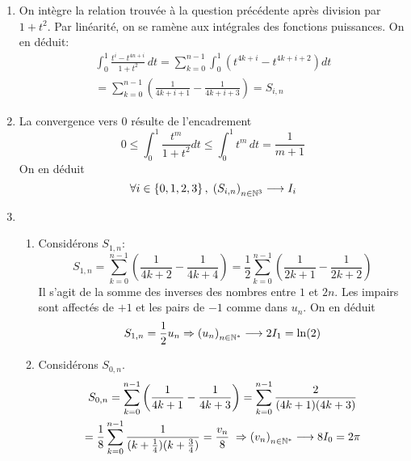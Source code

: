 \begin{enumerate}
  \item On intègre la relation trouvée à la question précédente après division par $1+t^2$. Par linéarité, on se ramène aux intégrales des fonctions puissances. On en déduit:
\begin{multline*}
\int_0^{1}\frac{t^{i} - t^{4n + i}}{1+t^2}\,dt 
= \sum_{k=0}^{n-1}\int_0^1\left( t^{4k+i} - t^{4k+i+2}\right)dt \\
= \sum_{k=0}^{n-1}\left(\frac{1}{4k+i+1} - \frac{1}{4k+i+3}\right)
= S_{i,n}
\end{multline*}

  
  \item La convergence vers $0$ résulte de l'encadrement
\begin{displaymath}
  0 \leq \int_0^1 \frac{t^m}{1+t^2}dt \leq \int_0^1 t^m\,dt = \frac{1}{m+1}
\end{displaymath}
On en déduit
\begin{displaymath}
\forall i\in \left\lbrace  0,1,2,3 \right\rbrace,\; \left( S_{i,n}\right)_{n\in \mathbb{N}^3} \longrightarrow I_i  
\end{displaymath}

  
  \item
\begin{enumerate}
  \item Considérons $S_{1,n}$:
\begin{displaymath}
S_{1,n} = \sum_{k=0}^{n-1}\left( \frac{1}{4k+2} - \frac{1}{4k+4}\right)  
= \frac{1}{2} \sum_{k=0}^{n-1}\left( \frac{1}{2k+1} - \frac{1}{2k+2}\right)
\end{displaymath}
Il s'agit de la somme des inverses des nombres entre $1$ et $2n$. Les impairs sont affectés de $+1$ et les pairs de $-1$ comme dans $u_n$. On en déduit
\begin{displaymath}
  S_{1,n} = \frac{1}{2}u_n \Rightarrow \left( u_n\right)_{n\in \mathbb{N}^*}\longrightarrow 2I_1 = \ln(2)
\end{displaymath}

  \item Considérons $S_{0,n}$.
\begin{multline*}
S_{0,n} = \sum_{k=0}^{n-1}\left( \frac{1}{4k+1} - \frac{1}{4k+3}\right) 
= \sum_{k=0}^{n-1} \frac{2}{(4k+1)(4k+3)} \\
= \frac{1}{8}\sum_{k=0}^{n-1}\frac{1}{(k+\frac{1}{4})(k+\frac{3}{4})}
= \frac{v_n}{8} \; \Rightarrow \left( v_n\right)_{n\in \mathbb{N}^*} \longrightarrow 8 I_0 = 2\pi
\end{multline*}

\end{enumerate}  
  

\end{enumerate}
